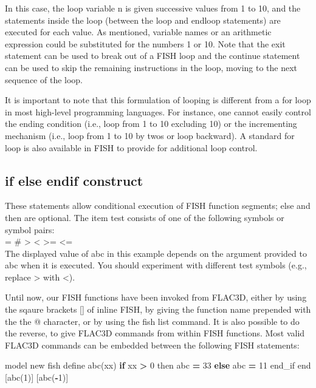 \documentclass[a4paper, nobind]{templates/ociamthesis}
\newenvironment{Shaded}{\begin{snugshade}}{\end{snugshade}}
\newcommand{\ControlFlowTok}[1]{\textcolor[rgb]{0.13,0.29,0.53}{\textbf{#1}}}
\newcommand{\DecValTok}[1]{\textcolor[rgb]{0.00,0.00,0.81}{#1}}
\newcommand{\NormalTok}[1]{#1}
\newcommand{\OperatorTok}[1]{\textcolor[rgb]{0.81,0.36,0.00}{\textbf{#1}}}
\renewenvironment{Shaded}
{
  \vspace{10pt}%
  \begin{snugshade}%
}{%
  \end{snugshade}%
  \vspace{8pt}%
}
\begin{document}
In this case, the loop variable n is given successive values from 1 to 10, and the statements inside the loop (between the loop and endloop statements) are executed for each value. As mentioned, variable names or an arithmetic expression could be substituted for the numbers 1 or 10. Note that the exit statement can be used to break out of a FISH loop and the continue statement can be used to skip the remaining instructions in the loop, moving to the next sequence of the loop.

It is important to note that this formulation of looping is different from a for loop in most high-level programming languages. For instance, one cannot easily control the ending condition (i.e., loop from 1 to 10 excluding 10) or the incrementing mechanism (i.e., loop from 1 to 10 by twos or loop backward). A standard for loop is also available in FISH to provide for additional loop control.

\hypertarget{if-else-endif-construct}{%
\subsection{if else endif construct}\label{if-else-endif-construct}}

These statements allow conditional execution of FISH function segments; else and then are optional. The item test consists of one of the following symbols or symbol pairs:\\

= \# \textgreater{} \textless{} \textgreater= \textless=\\

The displayed value of abc in this example depends on the argument provided to abc when it is executed. You should experiment with different test symbols (e.g., replace \textgreater{} with \textless).

Until now, our FISH functions have been invoked from FLAC3D, either by using the sqaure brackets {[}{]} of inline FISH, by giving the function name prepended with the the @ character, or by using the fish list command. It is also possible to do the reverse, to give FLAC3D commands from within FISH functions. Most valid FLAC3D commands can be embedded between the following FISH statements:

\begin{Shaded}
\begin{Highlighting}[]
\NormalTok{model new}
\NormalTok{fish define abc(xx)}
    \ControlFlowTok{if}\NormalTok{ xx }\OperatorTok{\textgreater{}} \DecValTok{0}\NormalTok{ then }
\NormalTok{        abc }\OperatorTok{=} \DecValTok{33}
    \ControlFlowTok{else}
\NormalTok{        abc }\OperatorTok{=} \DecValTok{11}
\NormalTok{    end\_if}
\NormalTok{end}
\NormalTok{[abc(}\DecValTok{1}\NormalTok{)]}
\NormalTok{[abc(}\OperatorTok{{-}}\DecValTok{1}\NormalTok{)]}
\end{Highlighting}
\end{Shaded}
\end{document}
